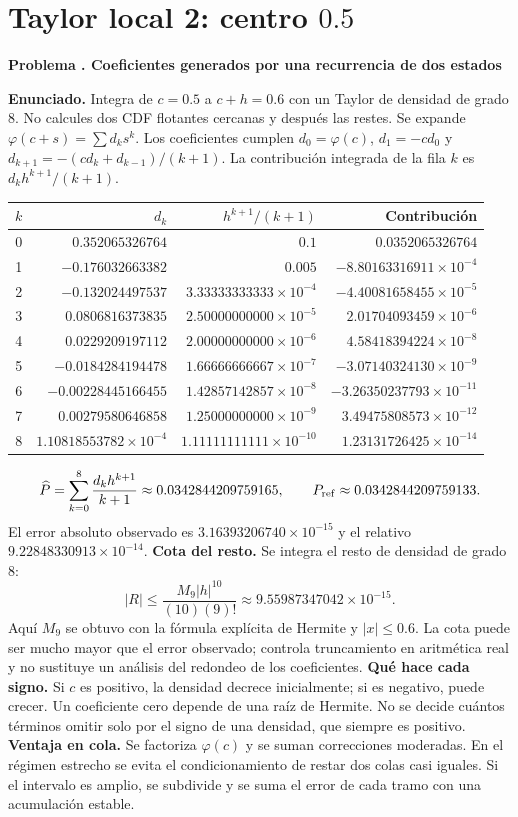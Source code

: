 \documentclass[11pt,a4paper]{article}
\theoremstyle{definition}
\newcounter{problema}
\newenvironment{resuelto}[1]{\refstepcounter{problema}\par\medskip\Needspace{6\baselineskip}\textbf{Problema \theproblema. #1}\par}{\par\medskip}
\begin{document}
\section{\texorpdfstring{Taylor local 2: centro $0.5$}{Taylor local 2: centro 0.5}}
\begin{resuelto}{Coeficientes generados por una recurrencia de dos estados}
\textbf{Enunciado.} Integra de $c=0.5$ a $c+h=0.6$ con un Taylor de densidad de grado 8. No calcules dos CDF flotantes cercanas y después las restes.
Se expande $\varphi(c+s)=\sum d_ks^k$. Los coeficientes cumplen $d_0=\varphi(c)$, $d_1=-cd_0$ y $d_{k+1}=-(cd_k+d_{k-1})/(k+1)$. La contribución integrada de la fila $k$ es $d_kh^{k+1}/(k+1)$.

\begin{center}\small\begin{tabular}{rrrr}
\toprule
$k$&$d_k$&$h^{k+1}/(k+1)$&Contribución\\
\midrule
0&$0.352065326764$&$0.1$&$0.0352065326764$\\
1&$-0.176032663382$&$0.005$&$-8.80163316911\times10^{-4}$\\
2&$-0.132024497537$&$3.33333333333\times10^{-4}$&$-4.40081658455\times10^{-5}$\\
3&$0.0806816373835$&$2.50000000000\times10^{-5}$&$2.01704093459\times10^{-6}$\\
4&$0.0229209197112$&$2.00000000000\times10^{-6}$&$4.58418394224\times10^{-8}$\\
5&$-0.0184284194478$&$1.66666666667\times10^{-7}$&$-3.07140324130\times10^{-9}$\\
6&$-0.00228445166455$&$1.42857142857\times10^{-8}$&$-3.26350237793\times10^{-11}$\\
7&$0.00279580646858$&$1.25000000000\times10^{-9}$&$3.49475808573\times10^{-12}$\\
8&$1.10818553782\times10^{-4}$&$1.11111111111\times10^{-10}$&$1.23131726425\times10^{-14}$\\
\bottomrule\end{tabular}\end{center}
\[
\widehat P=\sum_{k=0}^{8}\frac{d_kh^{k+1}}{k+1}\approx0.0342844209759165,\qquad P_{\rm ref}\approx0.0342844209759133.
\]
El error absoluto observado es $3.16393206740\times10^{-15}$ y el relativo $9.22848330913\times10^{-14}$.
\textbf{Cota del resto.} Se integra el resto de densidad de grado $8$:
\[
|R|\le\frac{M_{9}|h|^{10}}{(10)(9)!}\approx9.55987347042\times10^{-15}.
\]
Aquí $M_{9}$ se obtuvo con la fórmula explícita de Hermite y $|x|\le0.6$. La cota puede ser mucho mayor que el error observado; controla truncamiento en aritmética real y no sustituye un análisis del redondeo de los coeficientes.
\textbf{Qué hace cada signo.} Si $c$ es positivo, la densidad decrece inicialmente; si es negativo, puede crecer. Un coeficiente cero depende de una raíz de Hermite. No se decide cuántos términos omitir solo por el signo de una densidad, que siempre es positivo.
\textbf{Ventaja en cola.} Se factoriza $\varphi(c)$ y se suman correcciones moderadas. En el régimen estrecho se evita el condicionamiento de restar dos colas casi iguales. Si el intervalo es amplio, se subdivide y se suma el error de cada tramo con una acumulación estable.
\end{resuelto}
\end{document}
